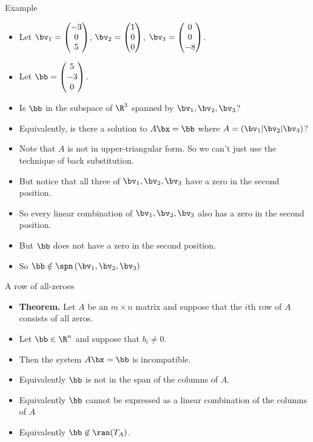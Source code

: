 \documentclass{beamer}
\begin{document}
\begin{frame}{Example}

\begin{itemize}
\item Let
$\bv_1 =
\begin{pmatrix}
-3 \\ 0 \\ 5
\end{pmatrix}
$,
$\bv_2 =
\begin{pmatrix}
1 \\ 0 \\ 0
\end{pmatrix}
$,
$\bv_3 =
\begin{pmatrix}
0 \\ 0 \\ -8
\end{pmatrix}
$.
\item Let
$\bb=
\begin{pmatrix}
5 \\ -3 \\0
\end{pmatrix}
$.
\item Is $\bb$ in the subspace of $\R^3$ spanned by $\bv_1,\bv_2,\bv_3$?
\item Equivalently, is there a solution to $A\bx=\bb$ where
$A= \left(\bv_1 \vert \bv_2 \vert \bv_3 \right)$?
\item Note that $A$ is not in upper-triangular form. So we can't just use the technique of back substitution.
\item But notice that all three of $\bv_1,\bv_2,\bv_3$ have a zero in the
second position.
\item So every linear combination of $\bv_1,\bv_2,\bv_3$ also has a zero in the
second position.
\item But $\bb$ does not have a zero in the second position.
\item So $\bb\notin\spn\left( \bv_1,\bv_2,\bv_3\right)$

\end{itemize}

\end{frame}


\begin{frame}{A row of all-zeroes}

\begin{itemize}
\item \textbf{Theorem.} Let $A$ be an $m\times n$ matrix and suppose that the $i$th row
of $A$ consists of all zeros.
\item Let $\bb\in\R^n$ and suppose that $b_i\not=0$.
\item Then the system $A\bx=\bb$ is incompatible.
\item Equivalently $\bb$ is not in the span of the columns of $A$.
\item Equivalently $\bb$ cannot be expressed as a linear combination of the columns of $A$
\item Equivalently $\bb\not\in\ran(T_A)$.

\end{itemize}

\end{frame}
\end{document}
